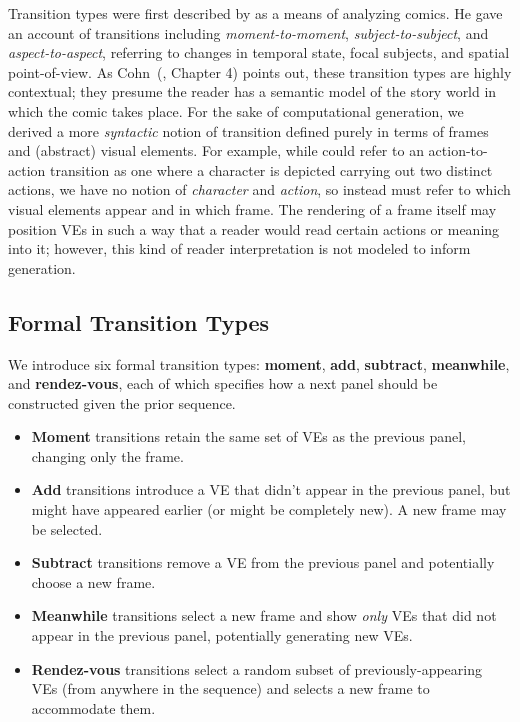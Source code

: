Transition types were first described by  
as a means of analyzing
comics. He gave an account of transitions including {\em moment-to-moment},
{\em subject-to-subject}, and {\em aspect-to-aspect}, referring to changes
in temporal state, focal subjects, and spatial point-of-view. As 
Cohn~(\citeyear{cohn2013visual}, Chapter 4) points out, these transition types are
highly contextual; they presume the reader has a semantic model of the
story world in which the comic takes place. For the sake of
computational generation, we derived a more {\em syntactic} notion of
transition defined purely in terms of frames and (abstract) visual
elements. For example, while \citeauthor{mcCloud1993understanding} could 
refer to an action-to-action
transition as one where a character is depicted carrying out two distinct
actions, we have no notion of {\em character} and {\em action}, so instead
must refer to which visual elements appear and in which frame. The
rendering of a frame itself may position VEs in such a way that a reader
would read certain actions or meaning into it; however, this kind of reader
interpretation is not modeled to inform generation.

\subsection{Formal Transition Types}

We introduce six formal transition types: {\bf moment}, {\bf add}, {\bf
subtract}, {\bf meanwhile}, and {\bf rendez-vous}, each of which specifies
how a next panel should be constructed given the prior sequence.

\begin{itemize}
\item {\bf Moment} transitions retain the same set of VEs as the previous panel, 
changing only the frame.

\item {\bf Add} transitions introduce a VE that didn't appear in the
previous panel, but might have appeared earlier (or might be completely
new). A new frame may be selected.

\item {\bf Subtract} transitions remove a VE from the previous panel and
potentially choose a new frame.

\item {\bf Meanwhile} transitions select a new frame and show {\em only}
VEs that did not appear in the previous panel, potentially generating new
VEs.

\item {\bf Rendez-vous} transitions select a random subset of
previously-appearing VEs (from anywhere in the sequence) and selects a new
frame to accommodate them.
\end{itemize}

